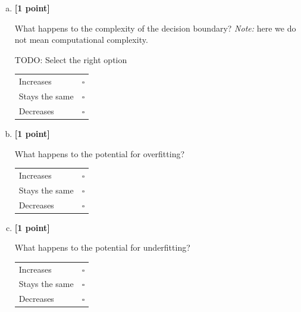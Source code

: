 \begin{enumerate}[(a)]
\pagebreak
    \item \textbf{[1 point]}
    \begin{tcolorbox}[colback=orange!5!white,colframe=orange!75!black]
    What happens to the complexity of the decision boundary? \emph{Note:} here we do not mean computational complexity.
    \end{tcolorbox}
    \begin{tcolorbox}[colback=white!5!white,colframe=green!75!black]
    TODO: Select the right option %

    \begin{tabular}[h]{lr}
    \toprule
    Increases & $\square$ \\
    Stays the same & $\square$ \\
    Decreases & $\square$ \\
    \bottomrule
    \end{tabular}
    \end{tcolorbox}

    \item \textbf{[1 point]}
    \begin{tcolorbox}[colback=orange!5!white,colframe=orange!75!black]
    What happens to the potential for overfitting?
    \end{tcolorbox}
    \begin{tcolorbox}[colback=white!5!white,colframe=green!75!black]

    \begin{tabular}[h]{lr}
    \toprule
    Increases & $\square$ \\
    Stays the same & $\square$ \\
    Decreases & $\square$ \\
    \bottomrule
    \end{tabular}
    \end{tcolorbox}

    \item \textbf{[1 point]}
    \begin{tcolorbox}[colback=orange!5!white,colframe=orange!75!black]
    What happens to the potential for underfitting?
    \end{tcolorbox}
    \begin{tcolorbox}[colback=white!5!white,colframe=green!75!black]
    
    \begin{tabular}[h]{lr}
    \toprule
    Increases & $\square$ \\
    Stays the same & $\square$ \\
    Decreases & $\square$ \\
    \bottomrule
    \end{tabular}
    \end{tcolorbox}


\end{enumerate}
